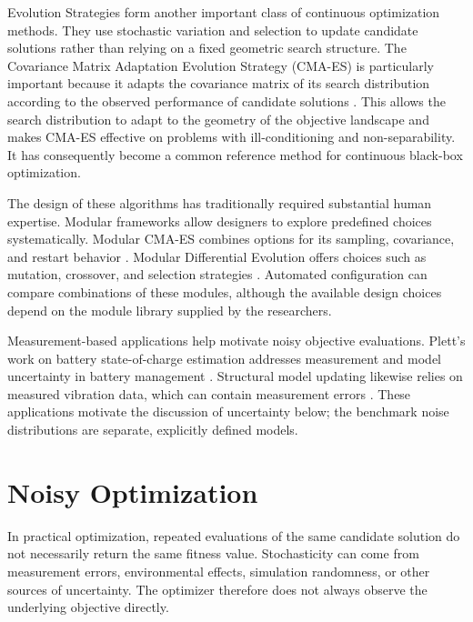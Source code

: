 Evolution Strategies form another important class of continuous optimization
methods. They use stochastic variation and selection to update candidate
solutions rather than relying on a fixed geometric search structure. The
Covariance Matrix Adaptation Evolution Strategy (CMA-ES) is particularly
important because it adapts the covariance matrix of its search distribution
according to the observed performance of candidate solutions
\cite{Hansen2001}. This allows the search distribution to adapt to the
geometry of the objective landscape and makes CMA-ES effective on problems
with ill-conditioning and non-separability. It has consequently become a
common reference method for continuous black-box optimization.

The design of these algorithms has traditionally required substantial human
expertise. Modular frameworks allow designers to explore predefined choices
systematically. Modular CMA-ES combines options for its sampling, covariance,
and restart behavior \cite{vanRijn2016,deNobel2021}. Modular Differential
Evolution offers choices such as mutation, crossover, and selection strategies
\cite{Vermetten2023ModularDE}. Automated configuration can compare combinations
of these modules, although the available design choices depend on the module
library supplied by the researchers.

Measurement-based applications help motivate noisy objective evaluations.
Plett's work on battery state-of-charge estimation addresses measurement and
model uncertainty in battery management \cite{Plett2004}. Structural model
updating likewise relies on measured vibration data, which can contain
measurement errors \cite{Mottershead1993,Marwala2010}. These applications
motivate the discussion of uncertainty below; the benchmark noise
distributions are separate, explicitly defined models.

\section{Noisy Optimization}
\label{sec:noisy_optimization}

In practical optimization, repeated evaluations of the same candidate
solution do not necessarily return the same fitness value. Stochasticity can
come from measurement errors, environmental effects, simulation randomness,
or other sources of uncertainty. The optimizer therefore does not always
observe the underlying objective directly.

